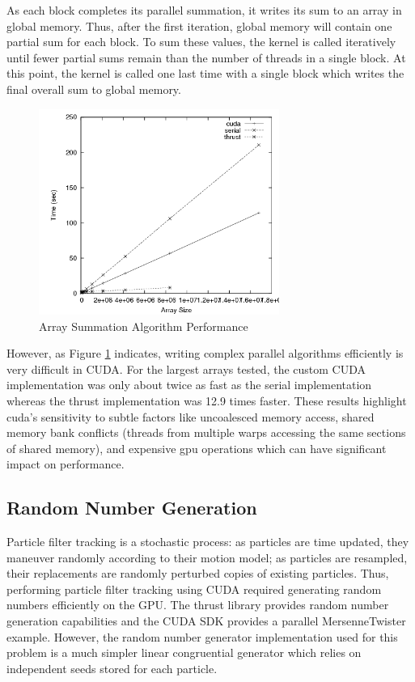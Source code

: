 \documentclass{article}
\begin{document}
As each block completes its parallel summation, it writes its sum to an array in global memory. Thus, after the first iteration, global memory will contain one partial sum for each block. To sum these values, the kernel is called iteratively until fewer partial sums remain than the number of threads in a single block. At this point, the kernel is called one last time with a single block which writes the final overall sum to global memory.

\begin{figure}
\centering
\includegraphics[width=0.7\textwidth]{data/summation_plot.png}
\caption{Array Summation Algorithm Performance}
\label{summation_plot}
\end{figure}

However, as Figure \ref{summation_plot} indicates, writing complex parallel algorithms efficiently is very difficult in CUDA. For the largest arrays tested, the custom CUDA implementation was only about twice as fast as the serial implementation whereas the thrust implementation was 12.9 times faster. These results highlight cuda's sensitivity to subtle factors like uncoalesced memory access, shared memory bank conflicts (threads from multiple warps accessing the same sections of shared memory), and expensive gpu operations which can have significant impact on performance.\cite{bestprac}

\subsection{Random Number Generation}
Particle filter tracking is a stochastic process: as particles are time updated, they maneuver randomly according to their motion model; as particles are resampled, their replacements are randomly perturbed copies of existing particles. Thus, performing particle filter tracking using CUDA required generating random numbers efficiently on the GPU. The thrust library provides random number generation capabilities and the CUDA SDK provides a parallel MersenneTwister example. However, the random number generator implementation used for this problem is a much simpler linear congruential generator which relies on independent seeds stored for each particle.
\end{document}

